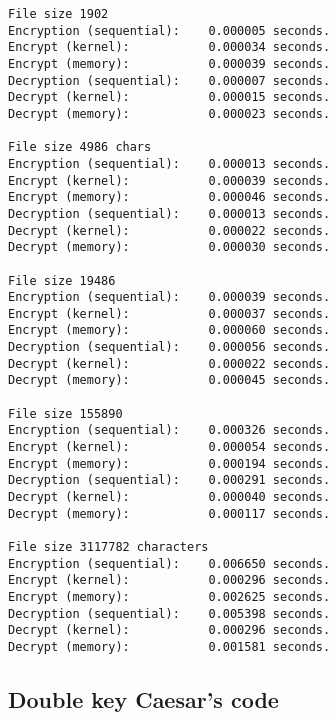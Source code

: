 \documentclass[a4paper]{article}
\begin{document}
\begin{verbatim}
File size 1902
Encryption (sequential): 	0.000005 seconds.
Encrypt (kernel): 			0.000034 seconds.
Encrypt (memory): 			0.000039 seconds.
Decryption (sequential): 	0.000007 seconds.
Decrypt (kernel): 			0.000015 seconds.
Decrypt (memory): 			0.000023 seconds.

File size 4986 chars
Encryption (sequential): 	0.000013 seconds.
Encrypt (kernel): 			0.000039 seconds.
Encrypt (memory): 			0.000046 seconds.
Decryption (sequential): 	0.000013 seconds.
Decrypt (kernel): 			0.000022 seconds.
Decrypt (memory): 			0.000030 seconds.

File size 19486
Encryption (sequential): 	0.000039 seconds.
Encrypt (kernel): 			0.000037 seconds.
Encrypt (memory): 			0.000060 seconds.
Decryption (sequential): 	0.000056 seconds.
Decrypt (kernel): 			0.000022 seconds.
Decrypt (memory): 			0.000045 seconds.

File size 155890
Encryption (sequential): 	0.000326 seconds.
Encrypt (kernel): 			0.000054 seconds.
Encrypt (memory): 			0.000194 seconds.
Decryption (sequential): 	0.000291 seconds.
Decrypt (kernel): 			0.000040 seconds.
Decrypt (memory): 			0.000117 seconds.

File size 3117782 characters
Encryption (sequential): 	0.006650 seconds.
Encrypt (kernel): 			0.000296 seconds.
Encrypt (memory): 			0.002625 seconds.
Decryption (sequential): 	0.005398 seconds.
Decrypt (kernel): 			0.000296 seconds.
Decrypt (memory): 			0.001581 seconds.
\end{verbatim}

\subsection{Double key Caesar's code}
\end{document}
